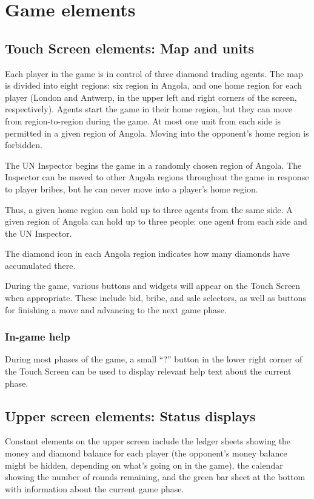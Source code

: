 \documentclass[8pt]{extbook}
\begin{document}
\section{Game elements}

\subsection{Touch Screen elements:  Map and units}
Each player in the game is in control of three diamond trading agents.  The map is divided into eight regions:  six region in Angola, and one home region for each player (London and Antwerp, in the upper left and right corners of the screen, respectively).  Agents start the game in their home region, but they can move from region-to-region during the game.  At most one unit from each side is permitted in a given region of Angola.  Moving into the opponent's home region is forbidden.

The UN Inspector begins the game in a randomly chosen region of Angola.  The Inspector can be moved to other Angola regions throughout the game in response to player bribes, but he can never move into a player's home region.

Thus, a given home region can hold up to three agents from the same side.  A given region of Angola can hold up to three people:  one agent from each side and the UN Inspector.

The diamond icon in each Angola region indicates how many diamonds have accumulated there.

During the game, various buttons and widgets will appear on the Touch Screen when appropriate.  These include bid, bribe, and sale selectors, as well as buttons for finishing a move and advancing to the next game phase.

\subsubsection{In-game help}

During most phases of the game, a small ``?'' button in the lower right corner of the Touch Screen can be used to display relevant help text about the current phase.

\subsection{Upper screen elements:  Status displays}

Constant elements on the upper screen include the ledger sheets showing the money and diamond balance for each player (the opponent's money balance might be hidden, depending on what's going on in the game), the calendar showing the number of rounds remaining, and the green bar sheet at the bottom with information about the current game phase.
\end{document}
